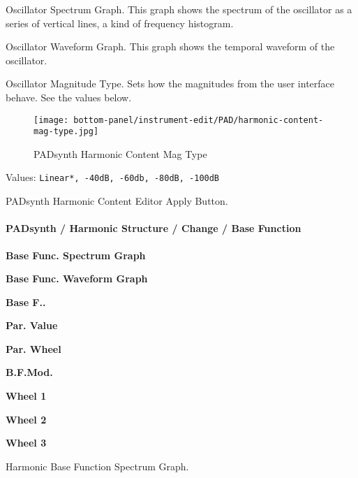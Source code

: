    Oscillator Spectrum Graph.
   This graph shows the spectrum of the oscillator as a series of vertical
   lines, a kind of frequency histogram.

   Oscillator Waveform Graph.
   This graph shows the temporal waveform  of the oscillator.

   Oscillator Magnitude Type.
   Sets how the magnitudes from the user interface behave.  See the values
   below.

\begin{figure}[H]
   \centering 
   \texttt{[image: bottom-panel/instrument-edit/PAD/harmonic-content-mag-type.jpg]}
   \caption{PADsynth Harmonic Content Mag Type}
   \label{fig:padsynth_harmonic_content_mag_type}
\end{figure}

   Values: \texttt{Linear*, -40dB, -60db, -80dB, -100dB}

   PADsynth Harmonic Content Editor Apply Button.

\paragraph{PADsynth / Harmonic Structure / Change / Base Function}
\label{paragraph:padsynth_harmonic_structure_change_base_function}

   \begin{enumber}
      \item \textbf{Base Func. Spectrum Graph}
      \item \textbf{Base Func. Waveform Graph}
      \item \textbf{Base F..}
      \item \textbf{Par. Value}
      \item \textbf{Par. Wheel}
      \item \textbf{B.F.Mod.}
      \item \textbf{Wheel 1}
      \item \textbf{Wheel 2}
      \item \textbf{Wheel 3}
   \end{enumber}

   \setcounter{ItemCounter}{0}      %

   Harmonic Base Function Spectrum Graph.

